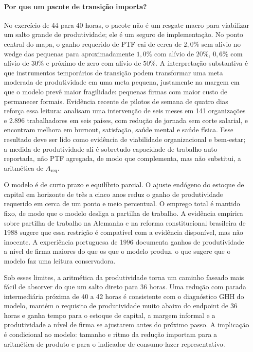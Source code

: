 \documentclass[10pt,twocolumn]{article}
\begin{document}
\paragraph{Por que um pacote de transi\c{c}\~ao importa?} No exerc\'icio de 44 para 40 horas, o pacote n\~ao \'e um resgate macro para viabilizar um salto grande de produtividade; ele \'e um seguro de implementa\c{c}\~ao. No ponto central do mapa, o ganho requerido de PTF cai de cerca de $2{,}0\%$ sem al\'ivio no wedge das pequenas para aproximadamente $1{,}0\%$ com al\'ivio de $20\%$, $0{,}6\%$ com al\'ivio de $30\%$ e pr\'oximo de zero com al\'ivio de $50\%$. A interpreta\c{c}\~ao substantiva \'e que instrumentos tempor\'arios de transi\c{c}\~ao podem transformar uma meta moderada de produtividade em uma meta pequena, justamente na margem em que o modelo prev\^e maior fragilidade: pequenas firmas com maior custo de permanecer formais. Evid\^encia recente de pilotos de semana de quatro dias refor\c{c}a essa leitura: \citet{FanSchorKellyGu2025} analisam uma interven\c{c}\~ao de seis meses em 141 organiza\c{c}\~oes e 2.896 trabalhadores em seis pa\'ises, com redu\c{c}\~ao de jornada sem corte salarial, e encontram melhora em burnout, satisfa\c{c}\~ao, sa\'ude mental e sa\'ude f\'isica. Esse resultado deve ser lido como evid\^encia de viabilidade organizacional e bem-estar; a medida de produtividade ali \'e sobretudo capacidade de trabalho auto-reportada, n\~ao PTF agregada, de modo que complementa, mas n\~ao substitui, a aritm\'etica de $A_{\mathrm{req}}$.

O modelo \'e de curto prazo e equil\'ibrio parcial. O ajuste end\'ogeno do estoque de capital em horizonte de tr\^es a cinco anos reduz o ganho de produtividade requerido em cerca de um ponto e meio percentual. O emprego total \'e mantido fixo, de modo que o modelo desliga a partilha de trabalho. A evid\^encia emp\'irica sobre partilha de trabalho na Alemanha \citep{Hunt1996} e na reforma constitucional brasileira de 1988 \citep{GonzagaMenezesFilhoCamargo2003} sugere que essa restri\c{c}\~ao \'e compat\'ivel com a evid\^encia dispon\'ivel, mas n\~ao inocente. A experi\^encia portuguesa de 1996 \citep{AsaiLopesTondini2024} documenta ganhos de produtividade a n\'ivel de firma maiores do que os que o modelo produz, o que sugere que o modelo faz uma leitura conservadora.

Sob esses limites, a aritm\'etica da produtividade torna um caminho faseado mais f\'acil de absorver do que um salto direto para 36 horas. Uma redu\c{c}\~ao com parada intermedi\'aria pr\'oxima de 40 a 42 horas \'e consistente com o diagn\'ostico GHH do modelo, mant\'em o requisito de produtividade muito abaixo do endpoint de 36 horas e ganha tempo para o estoque de capital, a margem informal e a produtividade a n\'ivel de firma se ajustarem antes do pr\'oximo passo. A implica\c{c}\~ao \'e condicional ao modelo: tamanho e ritmo da redu\c{c}\~ao importam para a aritm\'etica de produto e para o indicador de consumo-lazer representativo.
\end{document}

